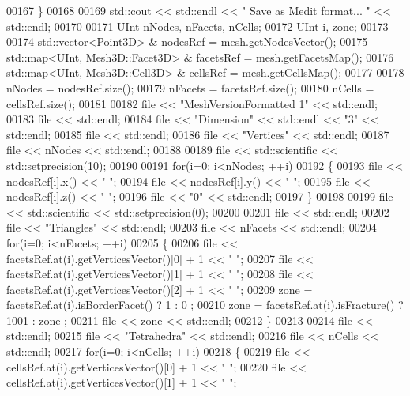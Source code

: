 \begin{DoxyCode}
00167     \}
00168 
00169     std::cout << std::endl << \textcolor{stringliteral}{" Save as Medit format... "} << std::endl;
00170 
00171     \hyperlink{namespaceFVCode3D_a4bf7e328c75d0fd504050d040ebe9eda}{UInt} nNodes, nFacets, nCells;
00172     \hyperlink{namespaceFVCode3D_a4bf7e328c75d0fd504050d040ebe9eda}{UInt} i, zone;
00173 
00174     std::vector<Point3D> & nodesRef = mesh.getNodesVector();
00175     std::map<UInt, Mesh3D::Facet3D> & facetsRef = mesh.getFacetsMap();
00176     std::map<UInt, Mesh3D::Cell3D> & cellsRef = mesh.getCellsMap();
00177 
00178     nNodes = nodesRef.size();
00179     nFacets = facetsRef.size();
00180     nCells = cellsRef.size();
00181 
00182     file << \textcolor{stringliteral}{"MeshVersionFormatted 1"} << std::endl;
00183     file << std::endl;
00184     file << \textcolor{stringliteral}{"Dimension"} << std::endl << \textcolor{stringliteral}{"3"} << std::endl;
00185     file << std::endl;
00186     file << \textcolor{stringliteral}{"Vertices"} << std::endl;
00187     file << nNodes << std::endl;
00188 
00189     file << std::scientific << std::setprecision(10);
00190 
00191     \textcolor{keywordflow}{for}(i=0; i<nNodes; ++i)
00192     \{
00193         file << nodesRef[i].x() << \textcolor{stringliteral}{"  "};
00194         file << nodesRef[i].y() << \textcolor{stringliteral}{"  "};
00195         file << nodesRef[i].z() << \textcolor{stringliteral}{"  "};
00196         file << \textcolor{stringliteral}{"0"} << std::endl;
00197     \}
00198 
00199     file << std::scientific << std::setprecision(0);
00200 
00201     file << std::endl;
00202     file << \textcolor{stringliteral}{"Triangles"} << std::endl;
00203     file << nFacets << std::endl;
00204     \textcolor{keywordflow}{for}(i=0; i<nFacets; ++i)
00205     \{
00206         file << facetsRef.at(i).getVerticesVector()[0] + 1 << \textcolor{stringliteral}{"  "};
00207         file << facetsRef.at(i).getVerticesVector()[1] + 1 << \textcolor{stringliteral}{"  "};
00208         file << facetsRef.at(i).getVerticesVector()[2] + 1 << \textcolor{stringliteral}{"  "};
00209         zone = facetsRef.at(i).isBorderFacet() ? 1 : 0 ;
00210         zone = facetsRef.at(i).isFracture() ? 1001 : zone ;
00211         file << zone << std::endl;
00212     \}
00213 
00214     file << std::endl;
00215     file << \textcolor{stringliteral}{"Tetrahedra"} << std::endl;
00216     file << nCells << std::endl;
00217     \textcolor{keywordflow}{for}(i=0; i<nCells; ++i)
00218     \{
00219         file << cellsRef.at(i).getVerticesVector()[0] + 1 << \textcolor{stringliteral}{"  "};
00220         file << cellsRef.at(i).getVerticesVector()[1] + 1 << \textcolor{stringliteral}{"  "};

\end{DoxyCode}
